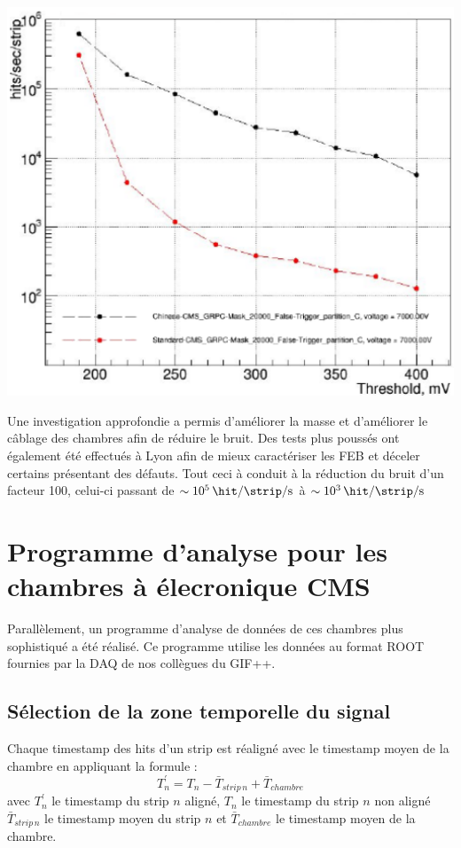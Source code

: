 \begin{minipage}[th!]{.48\textwidth}
	\noindent
	\centering
	\includegraphics[width=1\textwidth]{GLA/THNOISEH2.png}
	\label{THNOISEH2}
\end{minipage}

Une investigation approfondie a permis d'améliorer la masse et d'améliorer le câblage des chambres afin de réduire le bruit. Des tests plus poussés ont également été effectués à Lyon afin de mieux caractériser les FEB et déceler certains présentant des défauts. Tout ceci à conduit à la réduction du bruit d'un facteur \num{100}, celui-ci passant de $\sim\SI{e5}{\hit\per\strip\per\second}$ à $\sim\SI{e3}{\hit\per\strip\per\second}$

\section{Programme d’analyse pour les chambres à élecronique CMS}
\label{prog}
Parallèlement, un programme d'analyse de données de ces chambres plus sophistiqué a été réalisé. Ce programme utilise les données au format ROOT fournies par la DAQ de nos collègues du GIF++.

\subsection{Sélection de la zone temporelle du signal}
Chaque timestamp des hits d'un strip est réaligné avec le timestamp moyen de la chambre en appliquant la formule :
\begin{equation}
T^{'}_{n}=T_{n}-\bar{T}_{strip\, n}+\bar{T}_{chambre}
\end{equation}
avec $T^{'}_{n}$ le timestamp du strip $n$ aligné, $T_{n}$ le timestamp du strip $n$ non aligné $\bar{T}_{strip\, n}$ le timestamp moyen du strip $n$ et $\bar{T}_{chambre}$ le timestamp moyen de la chambre.

